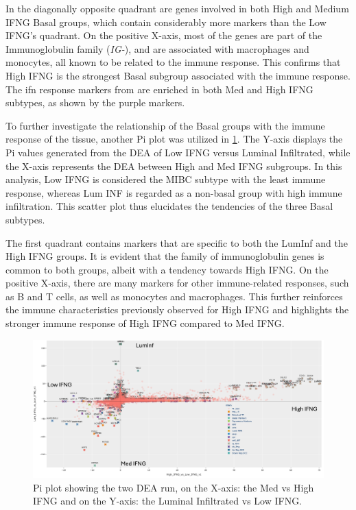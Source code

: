 In the diagonally opposite quadrant are genes involved in both High and Medium IFNG Basal groups, which contain considerably more markers than the Low IFNG's quadrant. On the positive X-axis, most of the genes are part of the Immunoglobulin family (\textit{IG-}), and are associated with macrophages and monocytes, all known to be related to the immune response. This confirms that High IFNG is the strongest Basal subgroup associated with the immune response. The \acrshort{ifn} response markers from \citet{Baker2022-bj} are enriched in both Med and High IFNG subtypes, as shown by the purple markers.


To further investigate the relationship of the Basal groups with the immune response of the tissue, another Pi plot was utilized in \cref{fig:cs:pi_basal_inf}. The Y-axis displays the Pi values generated from the DEA of Low IFNG versus Luminal Infiltrated, while the X-axis represents the DEA between High and Med IFNG subgroups. In this analysis, Low IFNG is considered the MIBC subtype with the least immune response, whereas Lum INF is regarded as a non-basal group with high immune infiltration. This scatter plot thus elucidates the tendencies of the three Basal subtypes.

The first quadrant contains markers that are specific to both the LumInf and the High IFNG groups. It is evident that the family of immunoglobulin genes is common to both groups, albeit with a tendency towards High IFNG. On the positive X-axis, there are many markers for other immune-related responses, such as B and T cells, as well as monocytes and macrophages. This further reinforces the immune characteristics previously observed for High IFNG and highlights the stronger immune response of High IFNG compared to Med IFNG.


\begin{figure}[!htb]    
    \centering
    \includegraphics[width=1.0\textwidth,keepaspectratio]{Sections/ClusteringAnalysis/Resources/discussion/basal_inf_pi.png}
    \caption{Pi plot showing the two DEA run, on the X-axis: the Med vs High IFNG and on the Y-axis: the Luminal Infiltrated vs Low IFNG. }
    \label{fig:cs:pi_basal_inf}
\end{figure}


